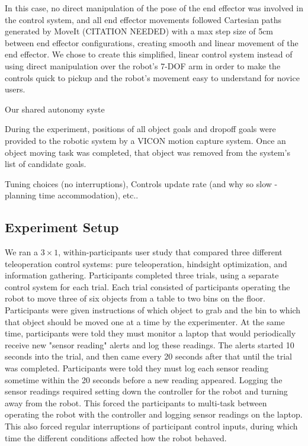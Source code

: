 \documentclass[conference]{IEEEtran}
\begin{document}
In this case, no direct manipulation of the pose of the end effector was involved in the control system, and all end effector movements followed Cartesian paths generated by MoveIt (CITATION NEEDED) with a max step size of 5cm between end effector configurations, creating smooth and linear movement of the end effector. We chose to create this simplified, linear control system instead of using direct manipulation over the robot's 7-DOF arm in order to make the controls quick to pickup and the robot's movement easy to understand for novice users.

Our shared autonomy syste


During the experiment, positions of all object goals and dropoff goals were provided to the robotic system by a VICON motion capture system. Once an object moving task was completed, that object was removed from the system's list of candidate goals.

Tuning choices (no interruptions), Controls update rate (and why so slow - planning time accommodation), etc..

\subsection{Experiment Setup}

We ran a $3 \times 1$, within-participants user study that compared three different teleoperation control systems: pure teleoperation, hindsight optimization, and information gathering. Participants completed three trials, using a separate control system for each trial. Each trial consisted of participants operating the robot to move three of six objects from a table to two bins on the floor. Participants were given instructions of which object to grab and the bin to which that object should be moved one at a time by the experimenter. At the same time, participants were told they must monitor a laptop that would periodically receive new "sensor reading" alerts and log these readings. The alerts started 10 seconds into the trial, and then came every 20 seconds after that until the trial was completed. Participants were told they must log each sensor reading sometime within the 20 seconds before a new reading appeared. Logging the sensor readings required setting down the controller for the robot and turning away from the robot. This forced the participants to multi-task between operating the robot with the controller and logging sensor readings on the laptop. This also forced regular interruptions of participant control inputs, during which time the different conditions affected how the robot behaved.
\end{document}
